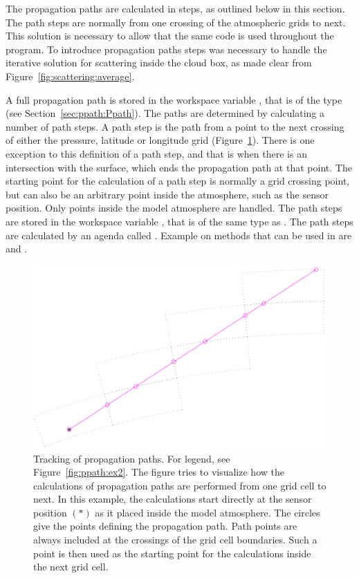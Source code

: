 The propagation paths are calculated in steps, as outlined below in
this section. The path steps are normally from one crossing of the
atmospheric grids to next. This solution is necessary to allow that
the same code is used throughout the program. To introduce propagation
paths steps was necessary to handle the iterative solution for
scattering inside the cloud box, as made clear from
Figure~\ref{fig:scattering:average}.

A full propagation path is stored in the workspace variable
, that is of the type  (see
Section~\ref{sec:ppath:Ppath}). The paths are determined by
calculating a number of path steps. A path step is the path from a
point to the next crossing of either the pressure, latitude or
longitude grid (Figure~\ref{fig:ppath:ex1}). There is one exception to
this definition of a path step, and that is when there is an
intersection with the surface, which ends the propagation path at that
point. The starting point for the calculation of a path step is
normally a grid crossing point, but can also be an arbitrary point
inside the atmosphere, such as the sensor position. Only points inside
the model atmosphere are handled. The path steps are stored in the
workspace variable , that is of the same type as
. The path steps are calculated by an agenda called
. Example on methods that can be used in
 are 
and .

\begin{figure}[!t]
 \begin{center}
  \includegraphics*[width=0.80\hsize]{Figs/ppath/ppath_ex1}
  \caption{Tracking of propagation paths. For legend, see 
    Figure~\ref{fig:ppath:ex2}. The figure tries to visualize how the
    calculations of propagation paths are performed from one grid cell
    to next. In this example, the calculations start directly at the
    sensor position $(\ast)$ as it placed inside the model
    atmosphere. The circles give the points defining the propagation
    path. Path points are always included at the crossings of the grid
    cell boundaries. Such a point is then used as the starting point
    for the calculations inside the next grid cell. }
  \label{fig:ppath:ex1}  
 \end{center}
\end{figure}

